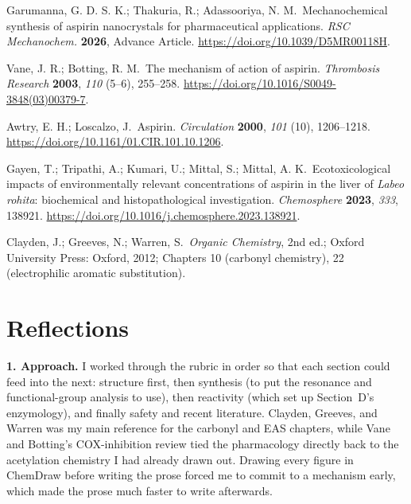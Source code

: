 \documentclass[9pt]{extarticle}
\begin{document}
\begin{enumerate}[label={[\arabic*]}]
\item Garumanna, G. D. S. K.; Thakuria, R.; Adassooriya, N. M.\
Mechanochemical synthesis of aspirin nanocrystals for pharmaceutical
applications. \emph{RSC Mechanochem.} \textbf{2026}, Advance Article.
\url{https://doi.org/10.1039/D5MR00118H}.

\item Vane, J. R.; Botting, R. M.\ The mechanism of action of aspirin.
\emph{Thrombosis Research} \textbf{2003}, \emph{110} (5--6),
255--258. \url{https://doi.org/10.1016/S0049-3848(03)00379-7}.

\item Awtry, E. H.; Loscalzo, J.\ Aspirin. \emph{Circulation}
\textbf{2000}, \emph{101} (10), 1206--1218.
\url{https://doi.org/10.1161/01.CIR.101.10.1206}.

\item Gayen, T.; Tripathi, A.; Kumari, U.; Mittal, S.; Mittal, A. K.\
Ecotoxicological impacts of environmentally relevant concentrations of
aspirin in the liver of \emph{Labeo rohita}: biochemical and
histopathological investigation. \emph{Chemosphere} \textbf{2023},
\emph{333}, 138921.
\url{https://doi.org/10.1016/j.chemosphere.2023.138921}.

\item Clayden, J.; Greeves, N.; Warren, S.\ \emph{Organic Chemistry},
2nd ed.; Oxford University Press: Oxford, 2012; Chapters 10
(carbonyl chemistry), 22 (electrophilic aromatic substitution).
\end{enumerate}

\section*{Reflections}

\textbf{1. Approach.}
I worked through the rubric in order so that each section could feed
into the next: structure first, then synthesis (to put the resonance
and functional-group analysis to use), then reactivity (which set up
Section~D's enzymology), and finally safety and recent literature.
Clayden, Greeves, and Warren was my main reference for the carbonyl
and EAS chapters, while Vane and Botting's COX-inhibition review
tied the pharmacology directly back to the acetylation chemistry I
had already drawn out. Drawing every figure in ChemDraw before
writing the prose forced me to commit to a mechanism early, which
made the prose much faster to write afterwards.
\end{document}
